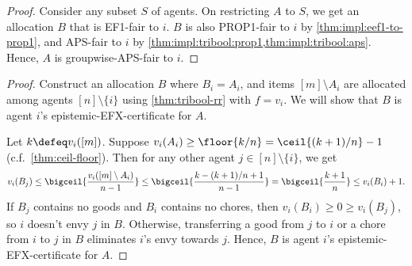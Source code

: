 \begin{proof}
Consider any subset $S$ of agents.
On restricting $A$ to $S$, we get an allocation $B$ that is EF1-fair to $i$.
$B$ is also PROP1-fair to $i$ by \cref{thm:impl:eef1-to-prop1},
and APS-fair to $i$ by \cref{thm:impl:tribool:prop1,thm:impl:tribool:aps}.
Hence, $A$ is groupwise-APS-fair to $i$.
\end{proof}

\begin{proof}
Construct an allocation $B$ where $B_i = A_i$, and items $[m] \setminus A_i$
are allocated among agents $[n] \setminus \{i\}$ using \cref{thm:tribool-rr} with $f = v_i$.
We will show that $B$ is agent $i$'s epistemic-EFX-certificate for $A$.

Let $k \defeq v_i([m])$.
Suppose $v_i(A_i) \ge \floor{k/n} = \ceil{(k+1)/n} - 1$ (c.f.~\cref{thm:ceil-floor}).
Then for any other agent $j \in [n] \setminus \{i\}$, we get
\[ v_i(B_j) \le \bigceil{\frac{v_i([m] \setminus A_i)}{n-1}}
    \le \bigceil{\frac{k - (k+1)/n + 1}{n-1}} = \bigceil{\frac{k+1}{n}}
    \le v_i(B_i) + 1. \]
If $B_j$ contains no goods and $B_i$ contains no chores,
then $v_i(B_i) \ge 0 \ge v_i(B_j)$, so $i$ doesn't envy $j$ in $B$.
Otherwise, transferring a good from $j$ to $i$ or a chore from $i$ to $j$ in $B$
eliminates $i$'s envy towards $j$.
Hence, $B$ is agent $i$'s epistemic-EFX-certificate for $A$.
\end{proof}
